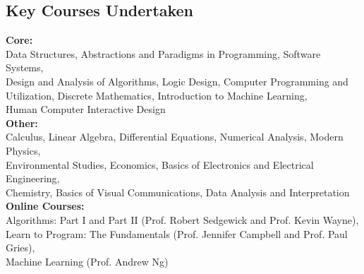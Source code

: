 \documentclass[margin,11pt]{resume}
\begin{document}
\begin{resume}
    \section{\mysidestyle Key Courses Undertaken} 

	\textbf{Core:} \\ Data Structures, Abstractions and Paradigms in Programming, Software Systems, \\ Design and Analysis of Algorithms, Logic Design, Computer Programming and Utilization, Discrete Mathematics, Introduction to Machine Learning,\\ Human Computer Interactive Design \\
	\textbf{Other:} \\ Calculus, Linear Algebra, Differential Equations, Numerical Analysis, Modern Physics, \\ Environmental Studies, Economics, Basics of Electronics and Electrical Engineering, \\ Chemistry, Basics of Visual Communications, Data Analysis and Interpretation\\
	\textbf{Online Courses:} \\ Algorithms: Part I and Part II (Prof. Robert Sedgewick and Prof. Kevin Wayne), \\ Learn to Program: The Fundamentals (Prof. Jennifer Campbell and Prof. Paul Gries), \\ Machine Learning (Prof. Andrew Ng)
\vspace{1mm}\\%


\end{resume}
\end{document}
